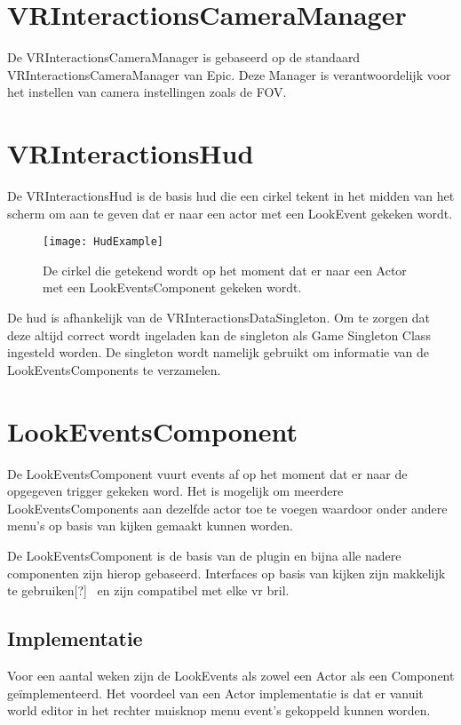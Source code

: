 \section{VRInteractionsCameraManager}
De VRInteractionsCameraManager is gebaseerd op de standaard VRInteractionsCameraManager van Epic. Deze Manager is verantwoordelijk voor het instellen van camera instellingen zoals de FOV. 

\section{VRInteractionsHud}
De VRInteractionsHud is de basis \gls{hud} die een cirkel tekent in het midden van het scherm om aan te geven dat er naar een actor met een LookEvent gekeken wordt.

\begin{figure}[H]
  \centering
    \texttt{[image: HudExample]}
    \caption{De cirkel die getekend wordt op het moment dat er naar een Actor met een LookEventsComponent gekeken wordt.}
\end{figure}

De \gls{hud} is afhankelijk van de VRInteractionsDataSingleton. Om te zorgen dat deze altijd correct wordt ingeladen kan de singleton als Game Singleton Class ingesteld worden. De singleton wordt namelijk gebruikt om informatie van de LookEventsComponents te verzamelen.

\section{LookEventsComponent}
De LookEventsComponent vuurt events af op het moment dat er naar de opgegeven trigger gekeken word. Het is mogelijk om meerdere LookEventsComponents aan dezelfde actor toe te voegen waardoor onder andere menu's op basis van kijken gemaakt kunnen worden.

De LookEventsComponent is de basis van de plugin en bijna alle nadere componenten zijn hierop gebaseerd. Interfaces op basis van kijken zijn makkelijk te gebruiken[?]~ en zijn compatibel met elke \gls{vr} bril.


\subsection{Implementatie}
Voor een aantal weken zijn de LookEvents als zowel een Actor als een Component geïmplementeerd. Het voordeel van een Actor implementatie is dat er vanuit world editor in het rechter muisknop menu event's gekoppeld kunnen worden.

